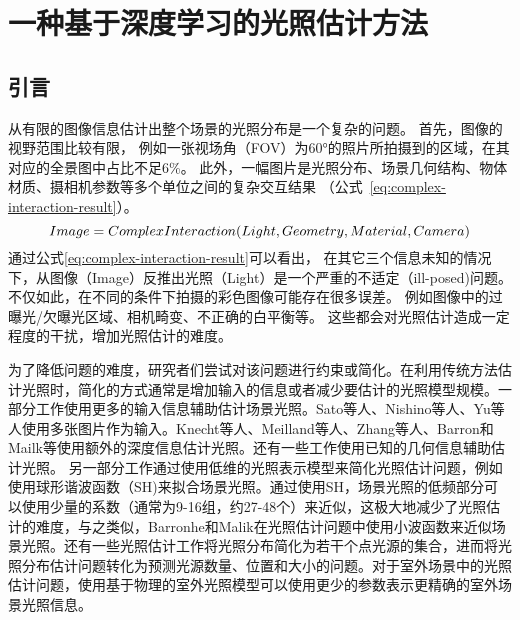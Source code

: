 \chapter{一种基于深度学习的光照估计方法}\label{chap:illumination-estimation}
\section{引言}
从有限的图像信息估计出整个场景的光照分布是一个复杂的问题。
首先，图像的视野范围比较有限，
例如一张视场角（FOV）为60°的照片所拍摄到的区域，在其对应的全景图中占比不足6\%。
此外，一幅图片是光照分布、场景几何结构、物体材质、摄相机参数等多个单位之间的复杂交互结果
（公式~\ref{eq:complex-interaction-result}）。
\begin{equation} \centering \label{eq:complex-interaction-result}
Image = ComplexInteraction(Light, Geometry, Material, Camera)\end{equation}
通过公式\ref{eq:complex-interaction-result}可以看出，
在其它三个信息未知的情况下，从图像（Image）反推出光照（Light）是一个严重的不适定（ill-posed)问题。
不仅如此，在不同的条件下拍摄的彩色图像可能存在很多误差。
例如图像中的过曝光/欠曝光区域、相机畸变、不正确的白平衡等。
这些都会对光照估计造成一定程度的干扰，增加光照估计的难度。

为了降低问题的难度，研究者们尝试对该问题进行约束或简化。在利用传统方法估计光照时，简化的方式通常是增加输入的信息或者减少要估计的光照模型规模。一部分工作使用更多的输入信息辅助估计场景光照。Sato等人\cite{sato1999acquiring}、Nishino\cite{nishino2001determining}等人、Yu\cite{yu2006sparse}等人使用多张图片作为输入。Knecht\cite{knecht2012reciprocal}等人、Meilland\cite{meilland20133d}等人、Zhang等人\cite{zhang2016emptying}、Barron和Mailk\cite{barron2013intrinsic}等使用额外的深度信息估计光照。还有一些工作使用已知的几何信息辅助估计光照\cite{ramamoorthi2001signal, sato2003illumination, li2003multiple}。
另一部分工作通过使用低维的光照表示模型来简化光照估计问题，例如使用球形谐波函数（SH)来拟合场景光照\cite{ramamoorthi2001signal,kemelmacher20113d,garrido2013reconstructing,
knorr2014real,li2014intrinsic,barron2015shape, rematas2016deep}。通过使用SH，场景光照的低频部分可以使用少量的系数（通常为9-16组，约27-48个）来近似，这极大地减少了光照估计的难度，与之类似，Barronhe和Malik\cite{okabe2004spherical}在光照估计问题中使用小波函数来近似场景光照。还有一些光照估计工作\cite{sato1999acquiring,  panagopoulos2011illumination, wang2002estimation, li2003multiple, sato2003illumination}将光照分布简化为若干个点光源的集合，进而将光照分布估计问题转化为预测光源数量、位置和大小的问题。对于室外场景中的光照估计问题，使用基于物理的室外光照模型\cite{lalonde2008does, lalonde2010sun, lalonde2012estimating, sunkavalli2008color}可以使用更少的参数表示更精确的室外场景光照信息。

